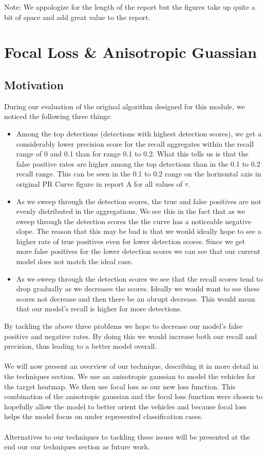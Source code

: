 \documentclass[letter]{article}
\newcommand{\setheader}[6]{
	\lhead{{\sc #1} {\sc #2}\\{} ({\small \it \today})}
	\rhead{
		{\bf #3} 
		\ifthenelse{\equal{#4}{}}{}{(#4)}\\
		{\bf #5}
		\ifthenelse{\equal{#6}{}}{}{(#6)}%
	}
}
\begin{document}
	\setheader{CSC490}{Module 1}{Ben Weisz}{}{Qiwen Hua}{}

	Note: We appologize for the length of the report but the figures take up quite a bit of space and add great value to the report.
	\section{Focal Loss \& Anisotropic Guassian}

	\subsection{Motivation}
	During our evaluation of the original algorithm designed for this module, we noticed the following three things:
	\begin{itemize}
		\item Among the top detections (detections with highest detection scores), we get a considerably lower precision score for the recall aggregates within the recall range of 0 and 0.1 than for range 0.1 to 0.2. What this tells us is that the false positive rates are higher among the top detections than in the 0.1 to 0.2 recall range. This can be seen in the 0.1 to 0.2 range on the horizontal axis in original PR Curve figure in report A for all values of $\tau$.
		\item As we sweep through the detection scores, the true and false positives are not evenly distributed in the aggregations. We see this in the fact that as we sweep through the detection scores the the curve has a noticeable negative slope. The reason that this may be bad is that we would ideally hope to see a higher rate of true positives even for lower detection scores. Since we get more false positives for the lower detection scores we can see that our current model does not match the ideal case.
		\item As we sweep through the detection scores we see that the recall scores tend to drop gradually as we decreases the scores. Ideally we would want to see these scores not decrease and then there be an abrupt decrease. This would mean that our model's recall is higher for more detections.
	\end{itemize}

	By tackling the above three problems we hope to decrease our model's false positive and negative rates. By doing this we would increase both our recall and precision, thus leading to a better model overall.\\\\
	We will now present an overview of our technique, describing it in more detail in the techniques section. We use an anisotropic gaussian to model the vehicles for the target heatmap. We then use focal loss as our new loss function. This combination of the anisotropic gaussian and the focal loss function were chosen to hopefully allow the model to better orient the vehicles and because focal loss helps the model focus on under represented classification cases.\\\\
	Alternatives to our techniques to tackling these issues will be presented at the end our our techniques section as future work.
\end{document}
